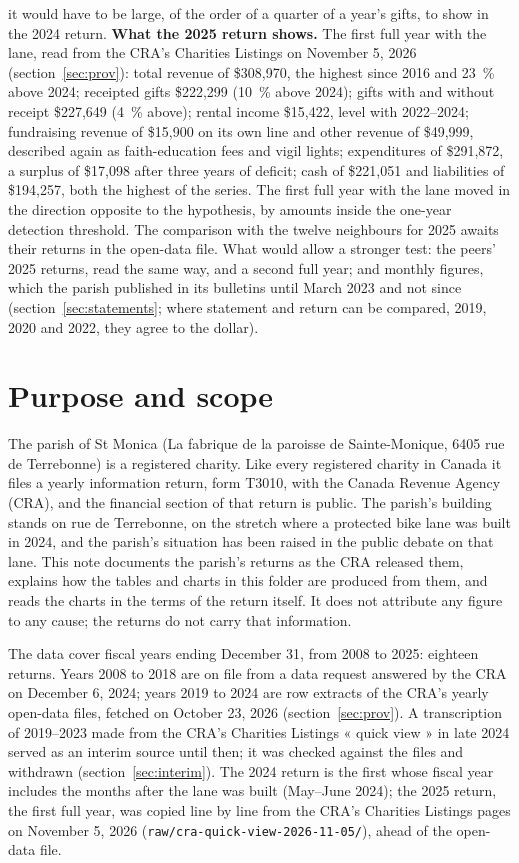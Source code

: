 \documentclass[11pt,letterpaper]{article}
\begin{document}
it would have to be large, of the order of a quarter of a year's gifts, to show in the 2024 return.  \textbf{What the 2025 return shows.} The first full year with the lane, read from the CRA's Charities Listings on November 5, 2026 (section~\ref{sec:prov}): total revenue of \$308,970, the highest since 2016 and 23~\% above 2024; receipted gifts \$222,299 (10~\% above 2024); gifts with and without receipt \$227,649 (4~\% above); rental income \$15,422, level with 2022--2024; fundraising revenue of \$15,900 on its own line and other revenue of \$49,999, described again as faith-education fees and vigil lights; expenditures of \$291,872, a surplus of \$17,098 after three years of deficit; cash of \$221,051 and liabilities of \$194,257, both the highest of the series. The first full year with the lane moved in the direction opposite to the hypothesis, by amounts inside the one-year detection threshold. The comparison with the twelve neighbours for 2025 awaits their returns in the open-data file. What would allow a stronger test: the peers' 2025 returns, read the same way, and a second full year; and monthly figures, which the parish published in its bulletins until March 2023 and not since (section~\ref{sec:statements}; where statement and return can be compared, 2019, 2020 and 2022, they agree to the dollar).

\section{Purpose and scope}

The parish of St Monica (La fabrique de la paroisse de Sainte-Monique, 6405 rue de Terrebonne) is a registered charity. Like every registered charity in Canada it files a yearly information return, form T3010, with the Canada Revenue Agency (CRA), and the financial section of that return is public. The parish's building stands on rue de Terrebonne, on the stretch where a protected bike lane was built in 2024, and the parish's situation has been raised in the public debate on that lane. This note documents the parish's returns as the CRA released them, explains how the tables and charts in this folder are produced from them, and reads the charts in the terms of the return itself. It does not attribute any figure to any cause; the returns do not carry that information.

The data cover fiscal years ending December 31, from 2008 to 2025: eighteen returns. Years 2008 to 2018 are on file from a data request answered by the CRA on December 6, 2024; years 2019 to 2024 are row extracts of the CRA's yearly open-data files, fetched on October 23, 2026 (section~\ref{sec:prov}). A transcription of 2019--2023 made from the CRA's Charities Listings « quick view » in late 2024 served as an interim source until then; it was checked against the files and withdrawn (section~\ref{sec:interim}). The 2024 return is the first whose fiscal year includes the months after the lane was built (May--June 2024); the 2025 return, the first full year, was copied line by line from the CRA's Charities Listings pages on November 5, 2026 (\texttt{raw/cra-quick-view-2026-11-05/}), ahead of the open-data file.
\end{document}
